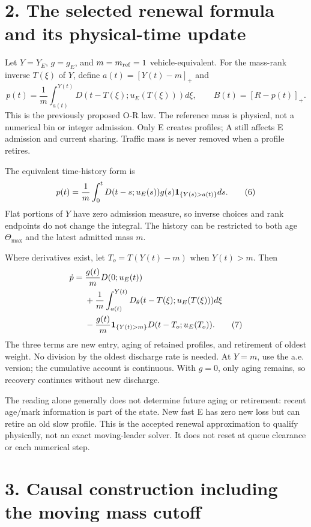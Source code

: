 \documentclass[11pt,a4paper]{article}
\newcommand{\pos}[1]{[#1]_+}
\begin{document}
\newpage
\section*{2. The selected renewal formula and its physical-time update}

Let $Y=Y_E$, $g=g_E$, and $m=m_{\rm ref}=1$ vehicle-equivalent. For
the mass-rank inverse $T(\xi)$ of $Y$, define $a(t)=\pos{Y(t)-m}$ and
\begin{equation}
 p(t)=\frac1m\int_{a(t)}^{Y(t)}
 D(t-T(\xi);u_E(T(\xi)))d\xi,\qquad B(t)=\pos{R-p(t)}. \tag{5}
\end{equation}
This is the previously proposed O-R law. The reference mass is physical,
not a numerical bin or integer admission. Only E creates profiles; A
still affects E admission and current sharing. Traffic mass is never
removed when a profile retires.

The equivalent time-history form is
\begin{equation}
 p(t)=\frac1m\int_0^t D(t-s;u_E(s))g(s)
                  {\bf1}_{\{Y(s)>a(t)\}}ds. \tag{6}
\end{equation}
Flat portions of $Y$ have zero admission measure, so inverse choices and
rank endpoints do not change the integral. The history can be restricted
to both age $\Theta_{\max}$ and the latest admitted mass $m$.

Where derivatives exist, let $T_o=T(Y(t)-m)$ when $Y(t)>m$. Then
\begin{align}
 \dot p={}&\frac{g(t)}mD(0;u_E(t))\nonumber\\
 &+\frac1m\int_{a(t)}^{Y(t)}
 D_\theta(t-T(\xi);u_E(T(\xi)))d\xi\nonumber\\
 &-\frac{g(t)}m{\bf1}_{\{Y(t)>m\}}
                    D(t-T_o;u_E(T_o)). \tag{7}
\end{align}
The three terms are new entry, aging of retained profiles, and retirement
of oldest weight. No division by the oldest discharge rate is needed.
At $Y=m$, use the a.e. version; the cumulative account is continuous.
With $g=0$, only aging remains, so recovery continues without new discharge.

The reading alone generally does not determine future aging or retirement:
recent age/mark information is part of the state. New fast E has zero new
loss but can retire an old slow profile. This is the accepted renewal
approximation to qualify physically, not an exact moving-leader solver.
It does not reset at queue clearance or each numerical step.

\newpage
\section*{3. Causal construction including the moving mass cutoff}
\end{document}
